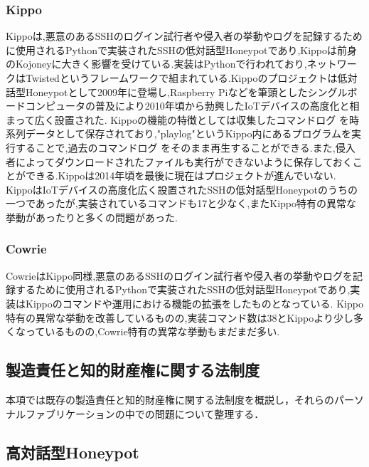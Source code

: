 \subsubsection{Kippo}
\label{issue:Kippo}

Kippoは,悪意のあるSSHのログイン試行者や侵入者の挙動やログを記録するために使用されるPythonで実装されたSSHの低対話型Honeypotであり\cite{kippo},Kippoは前身のKojoney\cite{kojoney}に大きく影響を受けている.実装はPythonで行われており,ネットワークはTwisted\cite{twisted}というフレームワークで組まれている.Kippoのプロジェクトは低対話型Honeypotとして2009年に登場し,Raspberry Pi\cite{rasp}などを筆頭としたシングルボードコンピュータ\cite{singleboard}の普及により2010年頃から勃興したIoTデバイスの高度化\cite{iot}と相まって広く設置された.
Kippoの機能の特徴としては収集したコマンドログ を時系列データとして保存されており,"playlog"というKippo内にあるプログラムを実行することで,過去のコマンドログ をそのまま再生することができる.また,侵入者によってダウンロードされたファイルも実行ができないように保存しておくことができる.Kippoは2014年頃を最後に現在はプロジェクトが進んでいない.\cite{kippowiki}
KippoはIoTデバイスの高度化広く設置されたSSHの低対話型Honeypotのうちの一つであったが,実装されているコマンドも17\cite{kippocommand}と少なく,またKippo特有の異常な挙動があったりと多くの問題があった.

\subsubsection{Cowrie}
\label{issue:Cowrie}
CowrieはKippo同様,悪意のあるSSHのログイン試行者や侵入者の挙動やログを記録するために使用されるPythonで実装されたSSHの低対話型Honeypotであり,実装はKippoのコマンドや運用における機能の拡張をしたものとなっている.
Kippo特有の異常な挙動を改善しているものの,実装コマンド数は38\cite{cowriecommand}とKippoより少し多くなっているものの\cite{differfromkippo},Cowrie特有の異常な挙動もまだまだ多い.

\subsection{製造責任と知的財産権に関する法制度}
\label{issue:lows}

本項では既存の製造責任と知的財産権に関する法制度を概説し，それらのパーソナルファブリケーションの中での問題について整理する．

\subsection{高対話型Honeypot}
\label{issue:HighInteractionHoneypot}

